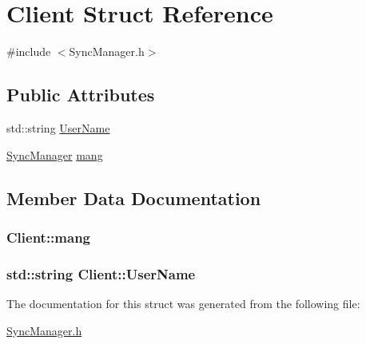 \hypertarget{structClient}{\section{Client Struct Reference}
\label{structClient}
}


{\ttfamily \#include $<$Sync\-Manager.\-h$>$}

\subsection*{Public Attributes}
\begin{DoxyCompactItemize}
\item 
std\-::string \hyperlink{structClient_ab7f15db4d839095430581e751cf761de}{User\-Name}
\item 
\hyperlink{classSyncManager}{Sync\-Manager} \hyperlink{structClient_ad72316e725154934219031a1ff985d1a}{mang}
\end{DoxyCompactItemize}


\subsection{Member Data Documentation}
\hypertarget{structClient_ad72316e725154934219031a1ff985d1a}{
\subsubsection[{mang}]{ Client\-::mang}}\label{structClient_ad72316e725154934219031a1ff985d1a}
\hypertarget{structClient_ab7f15db4d839095430581e751cf761de}{
\subsubsection[{User\-Name}]{\setlength{\rightskip}{0pt plus 5cm}std\-::string Client\-::\-User\-Name}}\label{structClient_ab7f15db4d839095430581e751cf761de}


The documentation for this struct was generated from the following file\-:\begin{DoxyCompactItemize}
\item 
\hyperlink{SyncManager_8h}{Sync\-Manager.\-h}\end{DoxyCompactItemize}
